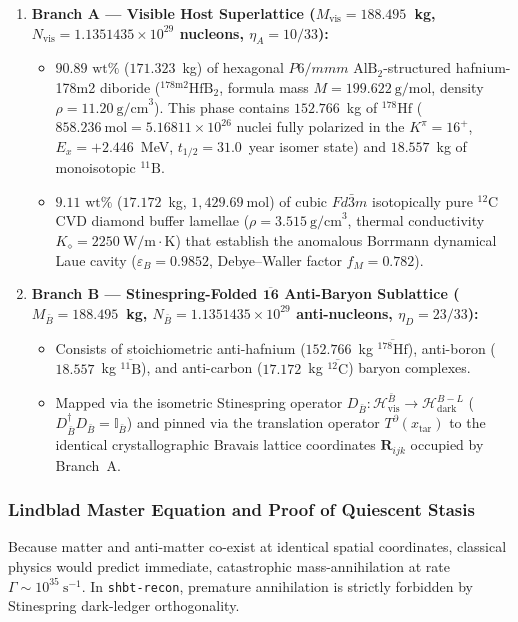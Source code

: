 \documentclass[11pt,onecolumn]{article}
\begin{document}
\begin{enumerate}
    \item \textbf{Branch A --- Visible Host Superlattice ($M_{\text{vis}} = 188.495$~kg, $N_{\text{vis}} = 1.1351435\times 10^{29}$ nucleons, $\eta_A = 10/33$):}
    \begin{itemize}
        \item $90.89\text{ wt\%}$ ($171.323$~kg) of hexagonal $P6/mmm$ $\text{AlB}_2$-structured hafnium-178m2 diboride ($^{178\text{m}2}\text{HfB}_2$, formula mass $M = 199.622~\text{g/mol}$, density $\rho = 11.20~\text{g/cm}^3$). This phase contains $152.766$~kg of $^{178}\text{Hf}$ ($858.236~\text{mol} = 5.16811\times 10^{26}$ nuclei fully polarized in the $K^\pi = 16^+$, $E_x = +2.446$~MeV, $t_{1/2} = 31.0$~year isomer state) and $18.557$~kg of monoisotopic $^{11}\text{B}$.
        \item $9.11\text{ wt\%}$ ($17.172$~kg, $1{,}429.69~\text{mol}$) of cubic $Fd\bar{3}m$ isotopically pure $^{12}\text{C}$ CVD diamond buffer lamellae ($\rho = 3.515~\text{g/cm}^3$, thermal conductivity $K_\diamond = 2250~\text{W/m}\cdot\text{K}$) that establish the anomalous Borrmann dynamical Laue cavity ($\varepsilon_B = 0.9852$, Debye--Waller factor $f_M = 0.782$).
    \end{itemize}
    \item \textbf{Branch B --- Stinespring-Folded $\overline{\mathbf{16}}$ Anti-Baryon Sublattice ($M_{\bar{B}} = 188.495$~kg, $N_{\bar{B}} = 1.1351435\times 10^{29}$ anti-nucleons, $\eta_D = 23/33$):}
    \begin{itemize}
        \item Consists of stoichiometric anti-hafnium ($152.766$~kg $\overline{^{178}\text{Hf}}$), anti-boron ($18.557$~kg $\overline{^{11}\text{B}}$), and anti-carbon ($17.172$~kg $\overline{^{12}\text{C}}$) baryon complexes.
        \item Mapped via the isometric Stinespring operator $D_{\bar{B}} : \mathcal{H}_{\text{vis}}^{\bar{B}} \to \mathcal{H}_{\text{dark}}^{B-L}$ ($D_{\bar{B}}^\dagger D_{\bar{B}} = \mathbb{I}_{\bar{B}}$) and pinned via the translation operator $T^\partial(x_{\text{tar}})$ to the identical crystallographic Bravais lattice coordinates $\mathbf{R}_{ijk}$ occupied by Branch~A.
    \end{itemize}
\end{enumerate}

\subsubsection{Lindblad Master Equation and Proof of Quiescent Stasis}
Because matter and anti-matter co-exist at identical spatial coordinates, classical physics would predict immediate, catastrophic mass-annihilation at rate $\Gamma \sim 10^{35}~\text{s}^{-1}$. In \texttt{shbt-recon}, premature annihilation is strictly forbidden by Stinespring dark-ledger orthogonality.
\end{document}
